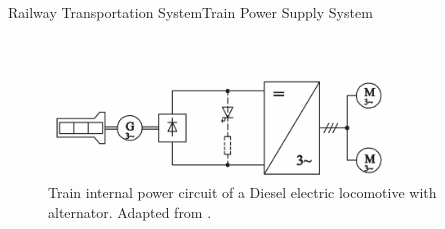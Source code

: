 \begin{frame}{Railway Transportation System}{Train Power Supply System}
\begin{minipage}[t]{0.24\linewidth} ~ \end{minipage}
\begin{minipage}[t]{0.48\linewidth}
	
	\begin{figure}[ht!]
		\centering
		\includegraphics[width=0.8\textwidth,keepaspectratio]{figures/31.PowerS/steimel2008c}
		\caption{Train internal power circuit of a Diesel electric locomotive with alternator. Adapted from \cite{steimel2008}.}
	\end{figure}
\end{minipage}

\end{frame}







